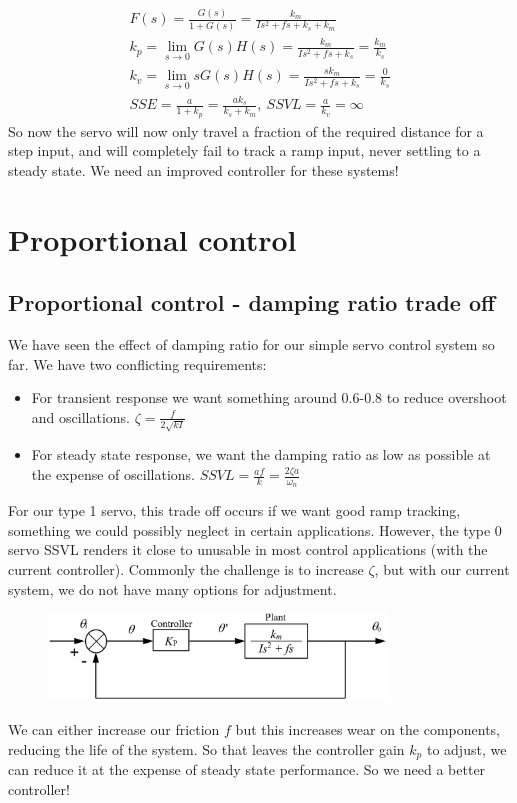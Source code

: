 \documentclass[class=report, crop=false, 12pt,a4paper]{standalone}
\begin{document}
\begin{gather}
  F(s) = \frac{G(s)}{1 + G(s)} = \frac{k_m}{Is^2 + fs + k_s + k_m}\\
  k_p = \lim_{s\rightarrow 0}G(s)H(s) = \frac{k_m}{Is^2 + fs+ k_s} = \frac{k_m}{k_s}\\
  k_v = \lim_{s\rightarrow 0} sG(s) H(s) = \frac{sk_m}{Is^2 + fs + k_s} = \frac{0}{k_s}\\
  SSE = \frac{a}{1 + k_p} = \frac{ak_s}{k_s + k_m}, \ SSVL = \frac{a}{k_v} = \infty
\end{gather}
So now the servo will now only travel a fraction of the required distance for a step input, and will completely fail to track a ramp input, never settling to a steady state. We need an improved controller for these systems!
\section{Proportional control}
\subsection{Proportional control - damping ratio trade off}
We have seen the effect of damping ratio for our simple servo control system so far. We have two conflicting requirements:
\begin{itemize}
  \item For transient response we want something around 0.6-0.8 to reduce overshoot and oscillations. $\zeta = \frac{f}{2\sqrt{kI}}$
  \item For steady state response, we want the damping ratio as low as possible at the expense of oscillations. $SSVL = \frac{af}{k} = \frac{2\zeta a }{\omega_n}$
\end{itemize}
For our type 1 servo, this trade off occurs if we want good ramp tracking, something we could possibly neglect in certain applications. However, the type 0 servo SSVL  renders it close to unusable in most control applications (with the current controller). Commonly the challenge is to increase $\zeta$, but with our current system, we do not have many options for adjustment. 
\begin{figure}[H]
  \centerline{\includegraphics[width = 0.8\textwidth]{../img/diagram109.png}}
  \caption{}
\end{figure}
We can either increase our friction $f$ but this increases wear on the components, reducing the life of the system. So that leaves the controller gain $k_p$ to adjust, we can reduce it at the expense of steady state performance. So we need a better controller!
\end{document}
